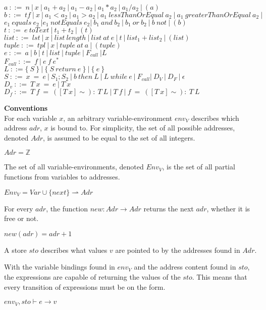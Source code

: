 $a\ ::=\ n\ |\ x\ |\ a_1+a_2\ |\ a_1-a_2\ |\ a_1*a_2\ |\ a_1/a_2\ |\ (a)$\\
$b\ ::=\ tf\ |\ x\ |\ a_1<a_2\ |\ a_1>a_2\ |\ a_1\ lessThanOrEqual\ a_2\ |\ a_1\ greaterThanOrEqual\ a_2\ |$\\ 
\phantom{xyzq.} $ e_1\ equals\ e_2\ | e_1\ notEquals\ e_2|\ b_1\ and\ b_2\ |\ b_1\ or\ b_2\ |\ b\ not\ | \ (b)$\\
$t\ ::=\ e\ toText\ |\ t_1+t_2\ |\ (t)$\\
$list\  ::=\ lst\ |\ x\ |\ list\ length\ |\ list\ at\ e\ |\ t\ |\ list_1 + list_2\ |\ (list)$\\
$tuple\ ::=\ tpl\ |\ x\ |\ tuple\ at\ a\ |\ (tuple)$\\
$e\     ::=\ a\ |\ b\ |\ t\ |\ list\ |\ tuple\ |\ F_{call}\ | L$\\
$F_{call}\ ::=\ f\ |\ e\ f\ e^*$\\
$L\     ::= \{\ S\ \}\ |\ \{\ S\ return\ e\ \}\ |\ \{\ e\ \}$\\
$S\     ::=\ x\ =\ e\ |\ S_1;S_2\ |\ b\ then\ L\ |\ L\ while\ e\ |\ F_{call} |\ D_V\ |\ D_F\ |\ \epsilon$\\
$D_v\   ::=\ T\ x\ =\ e\ |\ T\ x\ $\\
$D_f\   ::=\ T\ f\ =\ ([T\ x]\sim):\ T\ L\ |\ T\ f\ |\ f\ =\ ([T\ x]\sim):\ T\ L$

\textbf{\large{Conventions}} \\
For each variable $x$, an arbitrary variable-environment $env_V$ describes which address $adr$, $x$ is bound to.
For simplicity, the set of all possible addresses, denoted $Adr$, is assumed to be equal to the set of all integers.
\begin{center}
	$Adr = \mathbb{Z}$
\end{center}
The set of all variable-environments, denoted \textbf{$Env_V$}, is the set of all partial functions from variables to addresses.
\begin{center}
	$Env_V = Var \cup \{next\} \rightharpoonup Adr$
\end{center}
For every $adr$, the function $new : Adr \rightarrow Adr$ returns the next $adr$, whether it is free or not.
\begin{center}
	$new (adr) = adr + 1$
\end{center}
A store $sto$ describes what values $v$ are pointed to by the addresses found in $Adr$.

With the variable bindings found in $env_V$ and the address content found in $sto$, the expressions are capable of returning the values of the $sto$.
This means that every transition of expressions must be on the form.
\begin{center}
	$env_V,sto \vdash e \rightarrow v$
\end{center} 

